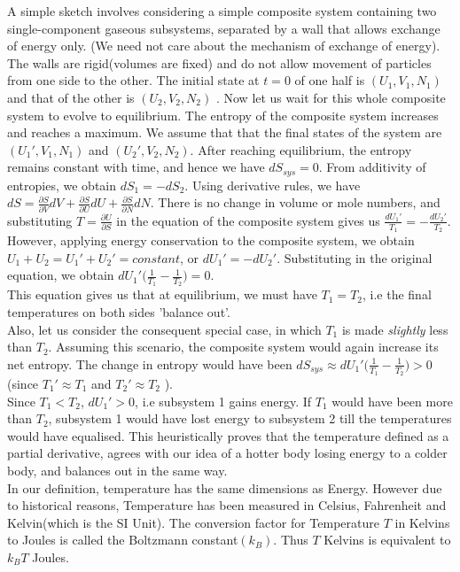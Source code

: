 \documentclass[oneside]{book}
\begin{document}
A simple sketch involves considering a simple composite system containing two single-component gaseous subsystems, separated by a wall that allows exchange of energy only. (We need not care about the mechanism of exchange of energy). The walls are rigid(volumes are fixed) and do not allow movement of particles from one side to the other. The initial state at $t = 0$ of one half is $(U_1,V_1,N_1)$ and that of the other is $(U_2,V_2,N_2)$ . Now let us wait for this whole composite system to evolve to equilibrium. The entropy of the composite system increases and reaches a maximum. We assume that that the final states of the system are $(U_1',V_1,N_1)$ and $(U_2',V_2,N_2)$. After reaching equilibrium, the entropy remains constant with time, and hence we have $dS_{sys} = 0$. From additivity of entropies, we obtain $dS_1 = -dS_2$. Using derivative rules, we have $ dS = \frac{\partial S}{\partial V}dV+ \frac{\partial S}{\partial U}dU + \frac{\partial S}{\partial N}dN$. There is no change in volume or mole numbers, and substituting $T =\frac{\partial U}{\partial S}$ in the equation of the composite system gives us $\frac{dU_1'}{T_1} = - \frac{dU_2'}{T_2} $. However, applying energy conservation to the composite system, we obtain $U_1 + U_2 = U_1' + U_2' = constant$, or $dU_1' = -dU_2'$. Substituting in the original equation, we obtain $dU_1'\big( \frac{1}{T_1} - \frac{1}{T_2}\big) = 0$.\\

This equation gives us that at equilibrium, we must have $T_1 = T_2$, i.e the final temperatures on both sides 'balance out'. \\  

Also, let us consider the consequent special case, in which $T_1$ is made \emph{slightly} less than $T_2$. Assuming this scenario, the composite system would again increase its net entropy. The change in entropy would have been $dS_{sys} \approx dU_1'\big( \frac{1}{T_1} - \frac{1}{T_2}\big) > 0 $  (since $ T_1' \approx T_1$ and $T_2' \approx T_2$ ). \\

Since $T_1 < T_2$, $dU_1'>0$, i.e subsystem 1 gains energy. If $T_1$ would have been more than $T_2$, subsystem 1 would have lost energy to subsystem 2 till the temperatures would have equalised. This heuristically proves that the temperature defined as a partial derivative, agrees with our idea of a hotter body losing energy to a colder body, and balances out in the same way.\\

In our definition, temperature has the same dimensions as Energy. However due to historical reasons, Temperature has been measured in Celsius, Fahrenheit and Kelvin(which is the SI Unit). The conversion factor for Temperature $T$ in Kelvins to Joules is called the Boltzmann constant$(k_B)$. Thus $T$ Kelvins is equivalent to $k_BT$ Joules.\\
\end{document}
